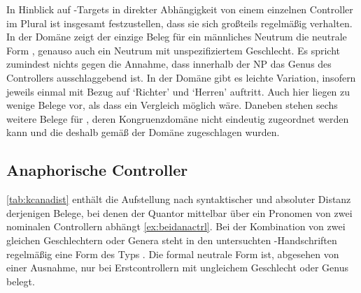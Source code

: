 In Hinblick auf -Targets in direkter Abhängigkeit von einem
einzelnen Controller im Plural ist insgesamt festzustellen, dass sie sich
großteils regelmäßig verhalten. In der Domäne  zeigt der
einzige Beleg für ein männliches Neutrum die neutrale Form ,
genauso auch ein Neutrum mit unspezifiziertem Geschlecht. Es spricht zumindest
nichts gegen die Annahme, dass innerhalb der NP das Genus des Controllers
ausschlaggebend ist. In der Domäne  gibt es leichte
Variation, insofern jeweils einmal  mit Bezug auf
 `Richter' und
 `Herren' auftritt. Auch hier liegen zu wenige Belege vor,
als dass ein Vergleich möglich wäre.
Daneben stehen sechs weitere Belege für , deren Kongruenzdomäne
nicht eindeutig zugeordnet werden kann und die deshalb gemäß \citet[623]{ksw2} der Domäne  zugeschlagen wurden.

\subsection{Anaphorische Controller}

\cref{tab:kcanadist} enthält die Aufstellung nach syntaktischer und absoluter
Distanz derjenigen Belege, bei denen der Quantor  mittelbar
über ein Pronomen von zwei nominalen Controllern abhängt
\cref{ex:beidanactrl}. Bei der Kombination von zwei gleichen Geschlechtern
oder Genera steht in den untersuchten \KC{}-Handschriften
regelmäßig eine Form des Typs . Die formal neutrale Form
 ist, abgesehen von einer Ausnahme, nur bei Erstcontrollern mit
ungleichem Geschlecht oder Genus belegt.

